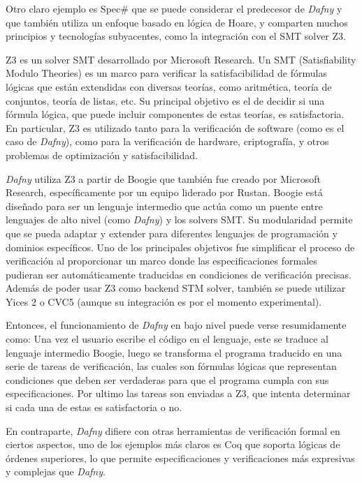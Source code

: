 \documentclass[runningheads]{llncs}
\begin{document}
Otro claro ejemplo es Spec\# que se puede considerar el predecesor de \textit{Dafny} y que también utiliza un enfoque basado en lógica de Hoare,
y comparten muchos principios y tecnologías subyacentes, como la integración con el SMT solver Z3.

Z3 es un solver SMT desarrollado por Microsoft Research. 
Un SMT (Satisfiability Modulo Theories) es un marco para verificar la satisfacibilidad de fórmulas lógicas que están extendidas con diversas teorías, como aritmética, teoría de conjuntos, teoría de listas, etc. 
Su principal objetivo es el de decidir si una fórmula lógica, que puede incluir componentes de estas teorías, es satisfactoria.
En particular, Z3 es utilizado tanto para la verificación de software (como es el caso de \textit{Dafny}),
como para la verificación de hardware, criptografía, y otros problemas de optimización y satisfacibilidad.

\textit{Dafny} utiliza Z3 a partir de Boogie que también fue creado por Microsoft Research, específicamente por un equipo liderado por Rustan. 
Boogie está diseñado para ser un lenguaje intermedio que actúa como un puente entre lenguajes de alto nivel (como \textit{Dafny}) y los solvers SMT. 
Su modularidad permite que se pueda adaptar y extender para diferentes lenguajes de programación y dominios específicos.
Uno de los principales objetivos fue simplificar el proceso de verificación al proporcionar un marco donde las especificaciones formales pudieran ser automáticamente 
traducidas en condiciones de verificación precisas. Además de poder usar Z3 como backend STM solver, 
también se puede utilizar Yices 2 o CVC5 (aunque su integración es por el momento experimental).

Entonces, el funcionamiento de \textit{Dafny} en bajo nivel puede verse resumidamente como: Una vez el usuario escribe el código en el lenguaje, este se traduce al lenguaje intermedio Boogie,
luego se transforma el programa traducido en una serie de tareas de verificación, las cuales son fórmulas lógicas que representan condiciones que deben ser verdaderas para que el programa cumpla con sus especificaciones.
Por ultimo las tareas son enviadas a Z3, que intenta determinar si cada una de estas es satisfactoria o no.

En contraparte, \textit{Dafny} difiere con otras herramientas de verificación formal en ciertos aspectos, uno de los ejemplos más claros es Coq 
que soporta lógicas de órdenes superiores, lo que permite especificaciones y verificaciones más expresivas y complejas que \textit{Dafny}.
\end{document}
